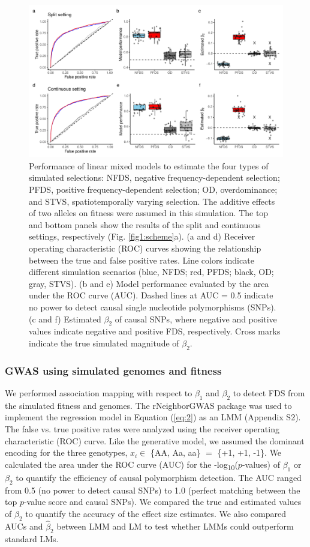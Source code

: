 \documentclass[12pt,]{article}
\begin{document}
\begin{figure}[ht]
  \includegraphics[width=0.85\linewidth]{beta2LMMadd.pdf}
  \caption{Performance of linear mixed models to estimate the four types of simulated selections: NFDS, negative frequency-dependent selection; PFDS, positive frequency-dependent selection; OD, overdominance; and STVS, spatiotemporally varying selection. The additive effects of two alleles on fitness were assumed in this simulation. The top and bottom panels show the results of the split and continuous settings, respectively (Fig. \ref{fig1:scheme}a). (a and d) Receiver operating characteristic (ROC) curves showing the relationship between the true and false positive rates. Line colors indicate different simulation scenarios (blue, NFDS; red, PFDS; black, OD; gray, STVS). (b and e) Model performance evaluated by the area under the ROC curve (AUC). Dashed lines at AUC = 0.5 indicate no power to detect causal single nucleotide polymorphisms (SNPs). (c and f) Estimated $\beta_2$ of causal SNPs, where negative and positive values indicate negative and positive FDS, respectively. Cross marks indicate the true simulated magnitude of $\beta_2$.}
  \label{figS:beta2LMMadd}
\end{figure}

\subsubsection*{GWAS using simulated genomes and fitness}
We performed association mapping with respect to $\beta_1$ and $\beta_2$ to detect FDS from the simulated fitness and genomes. The rNeighborGWAS package \citep{sato2019neighbor} was used to implement the regression model in Equation (\ref{eq:2}) as an LMM (Appendix S2). The false vs. true positive rates were analyzed using the receiver operating characteristic (ROC) curve. Like the generative model, we assumed the dominant encoding for the three genotypes, $x_i \in$ \{AA, Aa, aa\} $=$ \{+1, +1, -1\}. We calculated the area under the ROC curve (AUC) for the -log\textsubscript{10}($p$-values) of $\beta_1$ or $\beta_2$ to quantify the efficiency of causal polymorphism detection. The AUC ranged from 0.5 (no power to detect causal SNPs) to 1.0 (perfect matching between the top $p$-value score and causal SNPs). We compared the true and estimated values of $\beta_2$ to quantify the accuracy of the effect size estimates. We also compared AUCs and $\hat{\beta}_2$ between LMM and LM to test whether LMMs could outperform standard LMs.
\end{document}
